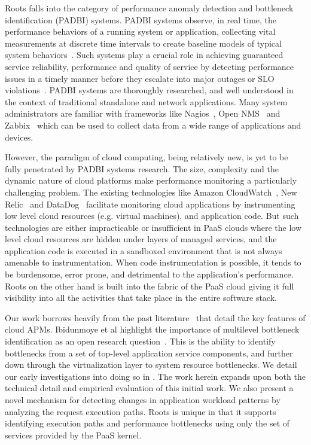 Roots falls into the category of performance anomaly detection and bottleneck identification (PADBI) systems.
PADBI systems observe, in real time, the performance behaviors
of a running system or application, collecting vital measurements at discrete time intervals to create baseline
models of typical system behaviors~\cite{Ibidunmoye:2015:PAD:2808687.2791120}. 
Such systems play a crucial role in achieving guaranteed service reliability, performance and
quality of service by detecting performance issues in a timely manner before they escalate into major outages
or SLO violations~\cite{6045942}. 
PADBI systems are thoroughly researched, and well understood in the context of traditional standalone and
network applications. Many system administrators are familiar with frameworks like 
Nagios~\cite{Harlan:2003:NMN:860375.860378}, Open NMS~\cite{opennms} and Zabbix~\cite{Tader:2010:SMZ:1883478.1883485} which
can be used to collect data from a wide range of applications and devices. 

However, the paradigm of cloud computing, being relatively new, is yet to be
fully penetrated by PADBI systems research. The size, complexity and the dynamic nature of 
cloud platforms make performance monitoring a particularly challenging problem.
The existing technologies like Amazon CloudWatch~\cite{cloudwatch},
New Relic~\cite{newrelic} and DataDog~\cite{datadog} facilitate monitoring cloud applications 
by instrumenting low level cloud resources (e.g. virtual machines), and application code. But such technologies
are either impracticable or insufficient in
PaaS clouds where the low level cloud resources are hidden under layers of managed
services, and the application code is executed in a sandboxed environment that is not
always amenable to instrumentation. When code instrumentation is possible, it tends to be
burdensome, error prone, and detrimental to the application's performance. Roots on the other hand is built into the 
fabric of the PaaS cloud giving it full visibility into all the activities that take place in the entire
software stack.

Our work borrows heavily from the past literature~\cite{DaCunhaRodrigues:2016:MCC:2851613.2851619,Ibidunmoye:2015:PAD:2808687.2791120} 
that detail the key features of cloud APMs. 
Ibidunmoye et al highlight the importance of multilevel bottleneck identification as an open research
question~\cite{Ibidunmoye:2015:PAD:2808687.2791120}. This is the ability to
identify bottlenecks from a set of top-level application service components, and further down through the 
virtualization layer to system resource bottlenecks.
We detail our early investigations into doing so
in \cite{Jayathilaka:2017:PMR:3038912.3052649}. The work herein expands 
upon both the technical detail and empirical evaluation of this initial 
work. We also present a novel mechanism for detecting changes in application workload patterns by analyzing
the request execution paths.
Roots is unique in that it supports identifying execution paths and performance bottlenecks using only the set
of services provided by the PaaS kernel.  

